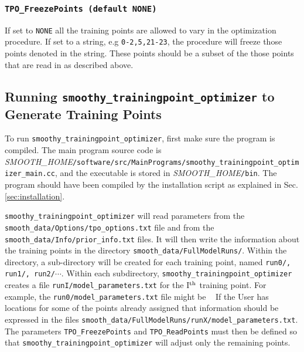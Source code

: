 \documentclass[UserManual.tex]{subfiles}
\begin{document}
\begin{sloppypar}
\subsubsection{{\tt TPO\_FreezePoints (default NONE)}}
If set to {\tt NONE} all the training points are allowed to vary in the optimization procedure. If set to a string, e.g {\tt 0-2,5,21-23}, the procedure will freeze those points denoted in the string. These points should be a subset of the those points that are read in as described above.
 
\subsection{Running {\tt smoothy\_trainingpoint\_optimizer} to Generate Training Points}

To run {\tt smoothy\_trainingpoint\_optimizer}, first make sure the program is compiled. The main program source code is {\it SMOOTH\_HOME}{\tt /software/src/MainPrograms/smoothy\_trainingpoint\_optimizer\_main.cc}, and the executable is stored in {\it SMOOTH\_HOME}{\tt /bin}. The program should have been compiled by the installation script as explained in Sec. \ref{sec:installation}.

{\tt smoothy\_trainingpoint\_optimizer} will read parameters from the {\tt smooth\_data/Options/tpo\_options.txt} file and from the {\tt smooth\_data/Info/prior\_info.txt} files. It will then write the information about the training points in the directory {\tt smooth\_data/FullModelRuns/}. Within the directory, a sub-directory will be created for each training point, named {\tt run0/, run1/, run2/}$\cdots$. Within each subdirectory, {\tt smoothy\_trainingpoint\_optimizer} creates a file {\tt runI/model\_parameters.txt} for the I$^{\rm th}$ training point. For example, the {\tt run0/model\_parameters.txt} file might be
{\tt\vspace*{-8pt}{\tt \begin{Verbatim}[commandchars=\\\{\}]
   NuclearCompressibility     229.08
   ScreeningMass              0.453
   Viscosity                  0.192
\end{Verbatim}
}\vspace*{-8pt}
}
If the User has locations for some of the points already assigned that information should be expressed in the files {\tt smooth\_data/FullModelRuns/runX/model\_parameters.txt}. The parameters {\tt TPO\_FreezePoints} and {\tt TPO\_ReadPoints} must then be defined so that {\tt smoothy\_trainingpoint\_optimizer} will adjust only the remaining points.


\end{sloppypar}
\end{document}
